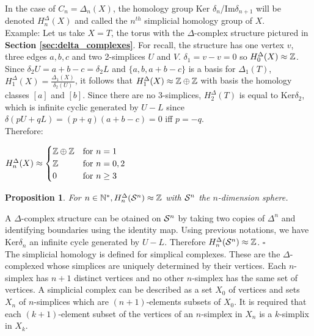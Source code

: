 \documentclass[12pt, a4paper]{article}
\newtheorem{proposition}{Proposition}
\newenvironment{proof}{{\sc Proof:}}{\hfill $\square$}
\begin{document}
In the case of $C_n = \Delta_n(X)$, the homology group Ker $\delta_n$/Im$\delta_{n+1}$ will be denoted $H^\Delta_n(X)$ and called the $n^{th}$ simplicial homology group of $X$. \\

Example: Let us take $X = T$, the torus with the $\Delta$-complex structure pictured in \textbf{Section \ref{sec:delta_complexes}}. For recall, the structure has one vertex $v$, three edges $a, b, c$ and two 2-simplices $U$ and $V$. $\delta_1 = v - v = 0$ so $H_0^\Delta(X) \approx \Z$. Since $\delta_2 U = a + b - c = \delta_2 L$ and $\{a, b, a+ b - c\}$ is a basis for $\Delta_1(T)$, $H_1^\Delta(X) = \frac{\Delta_1(X)}{\delta_2(U)}$, it follows that $H_1^\Delta(X) \approx \Z \oplus \Z$ with basis the homology classes $[a]$ and $[b]$. Since there are no 3-simplices, $H_2^\Delta(T)$ is equal to Ker$\delta_2$, which is infinite cyclic generated by $U-L$ since $\delta(pU+qL) = (p+q)(a+b-c) = 0$ iff $p = -q$.\\
Therefore:\\
\begin{center}
  $H_n^\Delta(X) \approx
  \begin{cases}
    \Z \oplus \Z &\text{for $n=1$}\\
    \Z &\text{for $n=0,2$}\\
    0 &\text{for $n\ge3$}
  \end{cases}$
\end{center}

\begin{proposition}
  For $n \in \N^*, H_n^\Delta(\S^n) \approx \Z$ with $\S^n$ the $n$-dimension sphere.
\end{proposition}
\begin{proof}
A $\Delta$-complex structure can be otained on $\S^n$ by taking two copies of $\Delta^n$ and identifying boundaries using the identity map. Using previous notations, we have Ker$\delta_n$ an infinite cycle generated by $U-L$. Therefore $H_n^\Delta(\S^n) \approx \Z$.
\end{proof}\\

The simplicial homology is defined for simplical complexes. These are the $\Delta$-complexed whose simplices are uniquely determined by their vertices. Each $n$-simplex has $n+1$ distinct vertices and no other $n$-simplex has the same set of vertices. A simplicial complex can be described as a set $X_0$ of vertices and sets $X_n$ of $n$-simplices which are $(n+1)$-elements subsets of $X_0$. It is required that each $(k+1)$-element subset of the vertices of an $n$-simplex in $X_n$ is a $k$-simplix in $X_k$.\\
\end{document}
